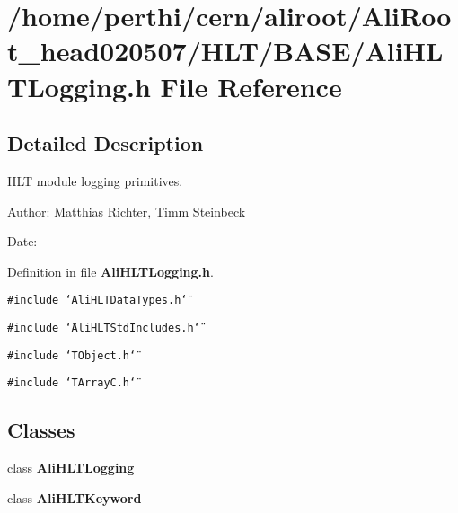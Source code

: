 \section{/home/perthi/cern/aliroot/Ali\-Root\_\-head020507/HLT/BASE/Ali\-HLTLogging.h File Reference}
\label{AliHLTLogging_8h}


\subsection{Detailed Description}
HLT module logging primitives. 

\begin{Desc}
\item[Author:]Matthias Richter, Timm Steinbeck \end{Desc}
\begin{Desc}
\item[Date:]\end{Desc}


Definition in file {\bf Ali\-HLTLogging.h}.

{\tt \#include \char`\"{}Ali\-HLTData\-Types.h\char`\"{}}\par
{\tt \#include \char`\"{}Ali\-HLTStd\-Includes.h\char`\"{}}\par
{\tt \#include \char`\"{}TObject.h\char`\"{}}\par
{\tt \#include \char`\"{}TArray\-C.h\char`\"{}}\par
\subsection*{Classes}
\begin{CompactItemize}
\item 
class {\bf Ali\-HLTLogging}
\item 
class {\bf Ali\-HLTKeyword}
\end{CompactItemize}
